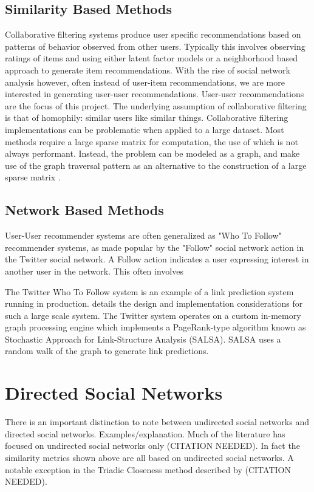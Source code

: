 \subsection{Similarity Based Methods}

Collaborative filtering systems produce user specific recommendations based on patterns of behavior observed from other users. Typically this involves observing ratings of items and using either latent factor models or a neighborhood based approach to generate item recommendations\cite{cf}. With the rise of social network analysis however, often instead of user-item recommendations, we are more interested in generating user-user recommendations. User-user recommendations are the focus of this project. The underlying assumption of collaborative filtering is that of homophily: similar users like similar things. Collaborative filtering implementations can be problematic when applied to a large dataset. Most methods require a large sparse matrix for computation, the use of which is not always performant. Instead, the problem can be modeled as a graph, and make use of the graph traversal pattern as an alternative to the construction of a large sparse matrix \cite{Rodriguez}.

\subsection{Network Based Methods}

User-User recommender systems are often generalized as "Who To Follow" recommender systems, as made popular by the "Follow" social network action in the Twitter social network. A Follow action indicates a user expressing interest in another user in the network. This often involves 

The Twitter Who To Follow system is an example of a link prediction system running in production. \cite{wtf} details the design and implementation considerations for such a large scale system. The Twitter system operates on a custom in-memory graph processing engine which implements a PageRank-type algorithm known as Stochastic Approach for Link-Structure Analysis (SALSA). SALSA uses a random walk of the graph to generate link predictions.

\section{Directed Social Networks}
There is an important distinction to note between undirected social networks and directed social networks. Examples/explanation. Much of the literature has focused on undirected social networks only (CITATION NEEDED). In fact the similarity metrics shown above are all based on undirected social networks. A notable exception in the Triadic Closeness method described by (CITATION NEEDED). 

